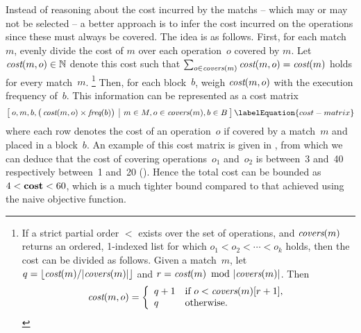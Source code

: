 Instead of reasoning about the cost incurred by the \glspl{match} -- which may
or may not be selected -- a better approach is to infer the cost incurred on the
\glspl{operation} since these must always be covered.
%
The idea is as follows.
%
First, for each \gls{match}~$m$, evenly divide the cost of $m$ over each
\gls{operation}~$o$ covered by $m$.
%
Let \mbox{$\operatorname{\textit{cost}}(m, o) \in \mathbb{N}$} denote this cost such that
\mbox{$\sum_{o \in \operatorname{\textit{covers}}(m)} \operatorname{\textit{cost}}(m, o) = \operatorname{\textit{cost}}(m)$} holds for every
\gls{match}~$m$.\!%
%
\footnote{%
  \setlength{\abovedisplayskip}{1ex}%
  \setlength{\belowdisplayskip}{1ex}%
  If a strict partial order $<$ exists over the set of \glspl{operation}, and
  $\operatorname{\textit{covers}}(m)$ returns an ordered, 1-indexed list for which \mbox{$o_1 < o_2 <
    \cdots < o_k$} holds, then the cost can be divided as follows.
  Given a match~$m$, let \mbox{$q = \lfloor \mCost(m) / \mCard{\!\mCovers(m)}
    \rfloor$} and \mbox{$r = \mCost(m) \! \mod \mCard{\!\mCovers(m)}$}.
  Then
  \begin{displaymath}
    \operatorname{\textit{cost}}(m, o) =
    \left\{
    \begin{array}{ll}
      q + 1 & \text{if $o < \operatorname{\textit{covers}}(m)[r+1]$}, \\
      q     & \text{otherwise}. \\
    \end{array}
    \right.
  \end{displaymath}
}
%
Then, for each \gls{block}~$b$, weigh \mbox{$\operatorname{\textit{cost}}(m, o)$} with the execution
frequency of~$b$.
%
This information can be represented as a cost matrix
%
\begin{equation}
  \begin{bmatrix}
    \begin{array}{@{\:}c|c@{\:}}
        o, m, b, \big( \mOpCost(m, o) \times \mFreq(b) \big)
      & m \in \mMatchSet, o \in \mCovers(m), b \in \mBlockSet
    \end{array}
  \end{bmatrix}
  \labelEquation{cost-matrix}
\end{equation}
where each row denotes the cost of an \gls{operation}~$o$ if covered by a
\gls{match}~$m$ and placed in a \gls{block}~$b$.
%
An example of this cost matrix is given in , from which
we can deduce that the cost of covering operations~$o_1$ and~$o_2$ is between~3
and~40 respectively between~1 and~20 ().
%
Hence the total cost can be bounded as \mbox{$4 < \mVar{cost} < 60$}, which is a
much tighter bound compared to that achieved using the naive \gls{objective
  function}.
